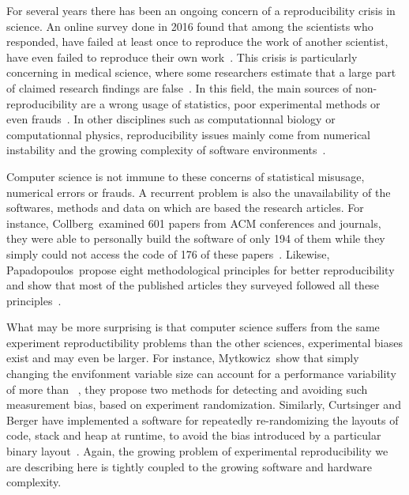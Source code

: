             For several years there has been an ongoing concern of a reproducibility crisis in science. An online survey
            done in 2016 found that among the  scientists who responded,  have failed at
            least once to reproduce the work of another scientist,  have even failed to reproduce
            their own work~\cite{nature_survey}. This crisis is particularly concerning in medical science, where some
            researchers estimate that a large part of claimed research findings are
            false~\cite{Ioannidis_2005,freedman}. In this field, the main sources of non-reproducibility are a wrong
            usage of statistics, poor experimental methods or even frauds~\cite{science_misconduct}. In other
            disciplines such as computationnal biology or computationnal physics, reproducibility issues mainly come
            from numerical instability and the growing complexity of software environments~\cite{dong2021}.

            Computer science is not immune to these concerns of statistical misusage, numerical errors or frauds.  A
            recurrent problem is also the unavailability of the softwares, methods and data on which are based the
            research articles. For instance, Collberg~\etal examined 601 papers from ACM conferences and journals, they
            were able to personally build the software of only 194 of them while they simply could not access the code
            of 176 of these papers~\cite{collberg2015repeatability}. Likewise, Papadopoulos~\etal propose eight
            methodological principles for better reproducibility and show that most of the published articles
            they surveyed followed all these principles~\cite{Papadopoulos_2019}.

            What may be more surprising is that computer science suffers from the same experiment reproductibility
            problems than the other sciences, experimental biases exist and may even be larger. For instance,
            Mytkowicz~\etal show that simply changing the envifonment variable size can account for a performance
            variability of more than ~\cite{Mytkowicz_2009}, they propose two methods for detecting
            and avoiding such measurement bias, based on experiment randomization. Similarly, Curtsinger and Berger have
            implemented a software for repeatedly re-randomizing the layouts of code, stack and heap at runtime, to
            avoid the bias introduced by a particular binary layout~\cite{stabilizer}. Again, the growing problem of
            experimental reproducibility we are describing here is tightly coupled to the growing software and hardware
            complexity.

